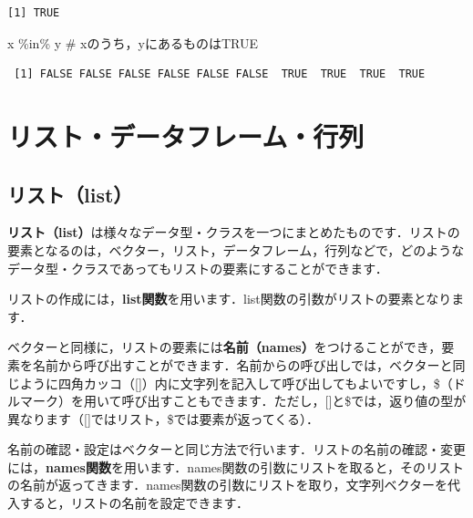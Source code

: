 \documentclass[
  letterpaper,
  DIV=11,
  numbers=noendperiod]{scrreprt}
\newenvironment{Shaded}{\begin{snugshade}}{\end{snugshade}}
\newcommand{\CommentTok}[1]{\textcolor[rgb]{0.37,0.37,0.37}{#1}}
\newcommand{\NormalTok}[1]{\textcolor[rgb]{0.00,0.23,0.31}{#1}}
\newcommand{\SpecialCharTok}[1]{\textcolor[rgb]{0.37,0.37,0.37}{#1}}
\begin{document}
\begin{verbatim}
[1] TRUE
\end{verbatim}

\begin{Shaded}
\begin{Highlighting}[]
\NormalTok{x }\SpecialCharTok{\%in\%}\NormalTok{ y }\CommentTok{\# xのうち，yにあるものはTRUE}
\end{Highlighting}
\end{Shaded}

\begin{verbatim}
 [1] FALSE FALSE FALSE FALSE FALSE FALSE  TRUE  TRUE  TRUE  TRUE
\end{verbatim}


\hypertarget{ux30eaux30b9ux30c8ux30c7ux30fcux30bfux30d5ux30ecux30fcux30e0ux884cux5217}{%
\chapter{リスト・データフレーム・行列}\label{ux30eaux30b9ux30c8ux30c7ux30fcux30bfux30d5ux30ecux30fcux30e0ux884cux5217}}

\hypertarget{ux30eaux30b9ux30c8list-1}{%
\section{リスト（list）}\label{ux30eaux30b9ux30c8list-1}}

\textbf{リスト（list）}は様々なデータ型・クラスを一つにまとめたものです．リストの要素となるのは，ベクター，リスト，データフレーム，行列などで，どのようなデータ型・クラスであってもリストの要素にすることができます．

リストの作成には，\textbf{list関数}を用います．list関数の引数がリストの要素となります．

ベクターと同様に，リストの要素には\textbf{名前（names）}をつけることができ，要素を名前から呼び出すことができます．名前からの呼び出しでは，ベクターと同じように四角カッコ（{[}{]}）内に文字列を記入して呼び出してもよいですし，\$（ドルマーク）を用いて呼び出すこともできます．ただし，{[}{]}と\$では，返り値の型が異なります（{[}{]}ではリスト，\$では要素が返ってくる）．

名前の確認・設定はベクターと同じ方法で行います．リストの名前の確認・変更には，\textbf{names関数}を用います．names関数の引数にリストを取ると，そのリストの名前が返ってきます．names関数の引数にリストを取り，文字列ベクターを代入すると，リストの名前を設定できます．
\end{document}
